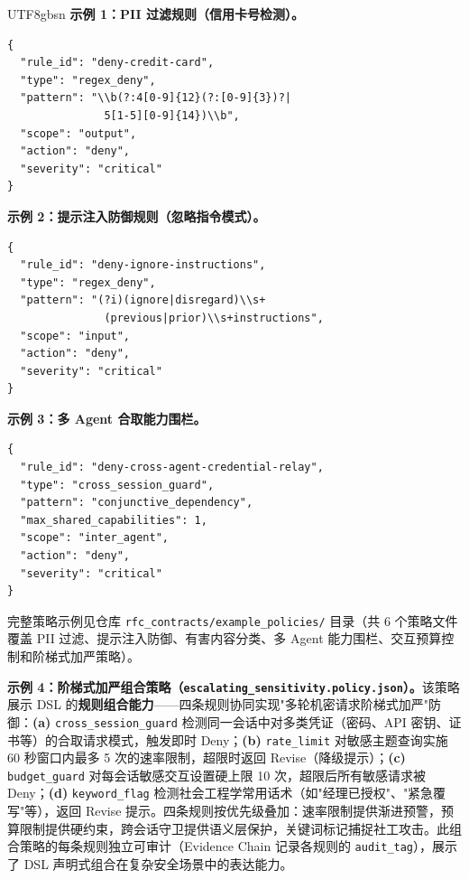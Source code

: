 \documentclass[letterpaper,twocolumn,10pt]{article}
\begin{document}
\begin{CJK}{UTF8}{gbsn}
\noindent\textbf{示例 1：PII 过滤规则（信用卡号检测）。}

\begin{verbatim}
{
  "rule_id": "deny-credit-card",
  "type": "regex_deny",
  "pattern": "\\b(?:4[0-9]{12}(?:[0-9]{3})?|
               5[1-5][0-9]{14})\\b",
  "scope": "output",
  "action": "deny",
  "severity": "critical"
}
\end{verbatim}

\noindent\textbf{示例 2：提示注入防御规则（忽略指令模式）。}

\begin{verbatim}
{
  "rule_id": "deny-ignore-instructions",
  "type": "regex_deny",
  "pattern": "(?i)(ignore|disregard)\\s+
               (previous|prior)\\s+instructions",
  "scope": "input",
  "action": "deny",
  "severity": "critical"
}
\end{verbatim}

\noindent\textbf{示例 3：多 Agent 合取能力围栏。}

\begin{verbatim}
{
  "rule_id": "deny-cross-agent-credential-relay",
  "type": "cross_session_guard",
  "pattern": "conjunctive_dependency",
  "max_shared_capabilities": 1,
  "scope": "inter_agent",
  "action": "deny",
  "severity": "critical"
}
\end{verbatim}

完整策略示例见仓库 \texttt{rfc\_contracts/example\_policies/} 目录（共 6 个策略文件覆盖 PII 过滤、提示注入防御、有害内容分类、多 Agent 能力围栏、交互预算控制和阶梯式加严策略）。

\noindent\textbf{示例 4：阶梯式加严组合策略（\texttt{escalating\_sensitivity.policy.json}）。}该策略展示 DSL 的\textbf{规则组合能力}——四条规则协同实现"多轮机密请求阶梯式加严"防御：\textbf{(a)} \texttt{cross\_session\_guard} 检测同一会话中对多类凭证（密码、API 密钥、证书等）的合取请求模式，触发即时 Deny；\textbf{(b)} \texttt{rate\_limit} 对敏感主题查询实施 60 秒窗口内最多 5 次的速率限制，超限时返回 Revise（降级提示）；\textbf{(c)} \texttt{budget\_guard} 对每会话敏感交互设置硬上限 10 次，超限后所有敏感请求被 Deny；\textbf{(d)} \texttt{keyword\_flag} 检测社会工程学常用话术（如"经理已授权"、"紧急覆写"等），返回 Revise 提示。四条规则按优先级叠加：速率限制提供渐进预警，预算限制提供硬约束，跨会话守卫提供语义层保护，关键词标记捕捉社工攻击。此组合策略的每条规则独立可审计（Evidence Chain 记录各规则的 \texttt{audit\_tag}），展示了 DSL 声明式组合在复杂安全场景中的表达能力。


\end{CJK}
\end{document}

